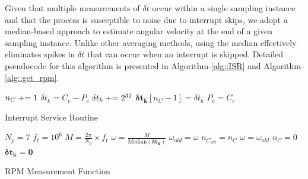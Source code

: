 Given that multiple measurements of $\delta t$ occur within a single sampling
instance and that the process is susceptible to noise due to interrupt skips, we
adopt a median-based approach to estimate angular velocity at the end of a given
sampling
instance. Unlike other averaging methods, using the median effectively
eliminates spikes in $\delta t$ that can occur when an interrupt is skipped.
Detailed pseudocode for this algorithm is presented in Algorithm-\ref{alg::ISR}
and Algorithm-\ref{alg::get_rpm}.


\LinesNumbered
\begin{algorithm}[H]
    \scriptsize
    $n_C \mathrel{+}= 1$\;
    $\delta t_k = C_c - P_c$\;
        {
         $\delta t_k \mathrel{+}= 2^{32}$}
    $\pmb{\delta t_k} [n_C-1] =  \delta t_k$\;
    $P_c = C_c$
    \caption{\small Interrupt Service Routine}
    \label{alg::ISR}
\end{algorithm}

\LinesNumbered
\begin{algorithm}[H]
    \scriptsize
    $N_p = 7$\;
    $f_t = 10^6$\;
    $M = \frac{2 \pi}{N_p} \times f_t$\;
        {
         $\omega = \frac{M}{\text{Median}(\pmb{\delta t_k})}$\;
         $ \omega_{old} = \omega$\;
         $n_{C_{old}} = n_C$\;
        }
         {$\omega = \omega_{old}$}
    $n_C = 0$
    $\pmb{\delta t_k} = \pmb 0$\;
    \caption{\small RPM Measurement Function}
    \label{alg::get_rpm}
\end{algorithm}

